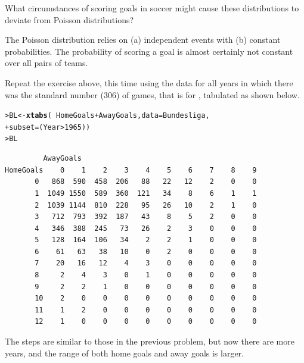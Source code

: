 \documentclass[10pt]{report}\usepackage[]{graphicx}\usepackage[]{color}
\makeatletter
\newcommand{\hlnum}[1]{\textcolor[rgb]{0.686,0.059,0.569}{#1}}%
\newcommand{\hlopt}[1]{\textcolor[rgb]{0,0,0}{#1}}%
\newcommand{\hlstd}[1]{\textcolor[rgb]{0.345,0.345,0.345}{#1}}%
\newcommand{\hlkwb}[1]{\textcolor[rgb]{0.69,0.353,0.396}{#1}}%
\newcommand{\hlkwc}[1]{\textcolor[rgb]{0.333,0.667,0.333}{#1}}%
\newcommand{\hlkwd}[1]{\textcolor[rgb]{0.737,0.353,0.396}{\textbf{#1}}}%
\newenvironment{kframe}{%
 \def\at@end@of@kframe{}%
 \ifinner\ifhmode%
  \def\at@end@of@kframe{\end{minipage}}%
  \begin{minipage}{\columnwidth}%
 \fi\fi%
 \def\FrameCommand##1{\hskip\@totalleftmargin \hskip-\fboxsep
 \colorbox{shadecolor}{##1}\hskip-\fboxsep
     \hskip-\linewidth \hskip-\@totalleftmargin \hskip\columnwidth}%
 \MakeFramed {\advance\hsize-\width
   \@totalleftmargin\z@ \linewidth\hsize
   \@setminipage}}%
 {\par\unskip\endMakeFramed%
 \at@end@of@kframe}
\newenvironment{knitrout}{}{} %
\renewenvironment{knitrout}{\small\renewcommand{\baselinestretch}{.85}}{} %
\makeatother
\begin{document}
\begin{Exercises}
\begin{enumerate*}
\begin{ans}
\begin{knitrout}
\end{knitrout}
    \end{ans}
    
    \item What circumstances of scoring goals in soccer might cause these distributions to
    deviate from Poisson distributions?
    \begin{ans}
    The Poisson distribution relies on (a) independent events with (b) constant probabilities. The probability of scoring a goal 
    is almost certainly not constant over all pairs of teams.
    \end{ans}
    
  \end{enumerate*}

  \exercise\exhard
  Repeat the exercise above, this time using the data for all years in which there was
  the standard number (306) of games, that is for , tabulated as shown below.
\begin{knitrout}\footnotesize
{}\color{fgcolor}\begin{kframe}
\begin{alltt}
\hlstd{> }\hlstd{BL} \hlkwb{<-} \hlkwd{xtabs}\hlstd{(}\hlopt{~} \hlstd{HomeGoals} \hlopt{+} \hlstd{AwayGoals,} \hlkwc{data} \hlstd{= Bundesliga,}
\hlstd{+ }            \hlkwc{subset} \hlstd{= (Year} \hlopt{>} \hlnum{1965}\hlstd{))}
\hlstd{> }\hlstd{BL}
\end{alltt}
\begin{verbatim}
         AwayGoals
HomeGoals    0    1    2    3    4    5    6    7    8    9
       0   868  590  458  206   88   22   12    2    0    0
       1  1049 1550  589  360  121   34    8    6    1    1
       2  1039 1144  810  228   95   26   10    2    1    0
       3   712  793  392  187   43    8    5    2    0    0
       4   346  388  245   73   26    2    3    0    0    0
       5   128  164  106   34    2    2    1    0    0    0
       6    61   63   38   10    0    2    0    0    0    0
       7    20   16   12    4    3    0    0    0    0    0
       8     2    4    3    0    1    0    0    0    0    0
       9     2    2    1    0    0    0    0    0    0    0
       10    2    0    0    0    0    0    0    0    0    0
       11    1    2    0    0    0    0    0    0    0    0
       12    1    0    0    0    0    0    0    0    0    0
\end{verbatim}
\end{kframe}
\end{knitrout}
    \begin{ans}
    The steps are similar to those in the previous problem, but now there are more years, and the
    range of both home goals and away goals is larger.
    \end{ans}



\end{Exercises}
\end{document}
